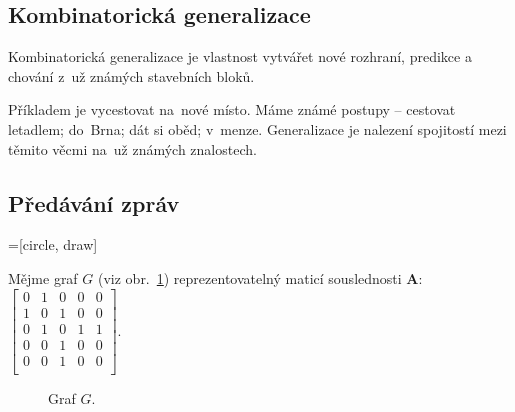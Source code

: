 \subsection{Kombinatorická generalizace}

Kombinatorická generalizace je vlastnost vytvářet nové rozhraní, predikce a chování z~už známých stavebních bloků.

Příkladem je vycestovat na~nové místo.
Máme známé postupy -- cestovat letadlem; do~Brna; dát si oběd; v~menze.
Generalizace je nalezení spojitostí mezi těmito věcmi na~už známých znalostech.

\subsection{Předávání zpráv}
=[circle, draw]

Mějme graf $G$ (viz obr.~\ref{graf-pro-predavani-zprav}) reprezentovatelný maticí souslednosti $\mathbf{A}$: 
$\left[ \begin{matrix}
0 & 1 & 0 & 0 & 0 \\
1 & 0 & 1 & 0 & 0 \\
0 & 1 & 0 & 1 & 1 \\
0 & 0 & 1 & 0 & 0 \\
0 & 0 & 1 & 0 & 0 \\
\end{matrix} \right]$.

\begin{figure}[ht]
    \centering
    \caption{Graf $G$.}
    \label{graf-pro-predavani-zprav}
\end{figure}
\FloatBarrier

